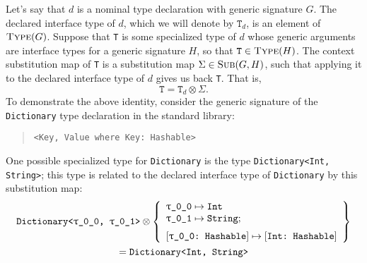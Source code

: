 \documentclass[../generics]{subfiles}
\begin{document}
Let's say that $d$ is a nominal type declaration with generic signature $G$. The declared interface type of $d$, which we will denote by $\texttt{T}_d$, is an element of $\textsc{Type}({G})$. Suppose that \texttt{T} is some specialized type of $d$ whose generic arguments are interface types for a generic signature $H$, so that $\texttt{T}\in\textsc{Type}({H})$. The context substitution map of \texttt{T} is a substitution map $\Sigma\in\textsc{Sub}({G, H})$, such that applying it to the declared interface type of $d$ gives us back \texttt{T}. That is,
\[
\texttt{T}=\texttt{T}_d\otimes\Sigma.
\]
To demonstrate the above identity, consider the generic signature of the \texttt{Dictionary} type declaration in the standard library:
\begin{quote}
\texttt{<Key, Value where Key:\ Hashable>}
\end{quote}
One possible specialized type for \texttt{Dictionary} is the type \texttt{Dictionary<Int, String>}; this type is related to the declared interface type of \texttt{Dictionary} by this substitution map:
\begin{multline*}
\texttt{Dictionary<\ttgp{0}{0}, \ttgp{0}{1}>}\otimes
\SubstMapLongC{
\SubstType{\ttgp{0}{0}}{Int}\\
\SubstType{\ttgp{0}{1}}{String}
}{
\SubstConf{\ttgp{0}{0}}{Int}{Hashable}
}\\
= \texttt{Dictionary<Int, String>}
\end{multline*}
\end{document}
